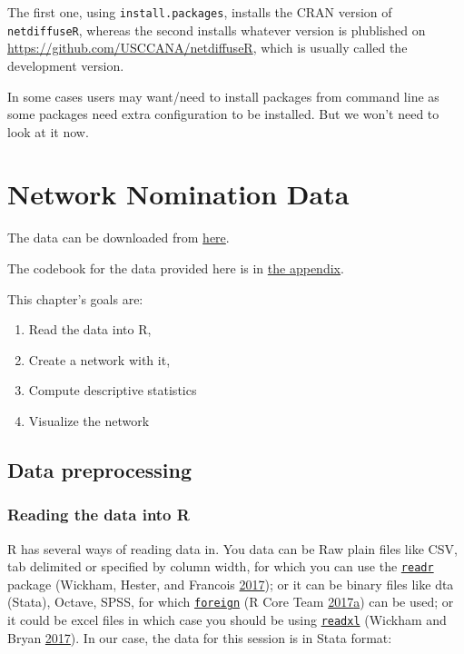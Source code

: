 \documentclass[]{book}
\theoremstyle{definition}
\theoremstyle{definition}
\theoremstyle{definition}
\theoremstyle{remark}
\begin{document}
The first one, using \texttt{install.packages}, installs the CRAN
version of \texttt{netdiffuseR}, whereas the second installs whatever
version is plublished on \url{https://github.com/USCCANA/netdiffuseR},
which is usually called the development version.

In some cases users may want/need to install packages from command line
as some packages need extra configuration to be installed. But we won't
need to look at it now.

\chapter{Network Nomination Data}\label{network-nomination-data}

The data can be downloaded from
\href{https://cdn.rawgit.com/gvegayon/appliedsnar/fdc0d26f/03-sns.dta}{here}.

The codebook for the data provided here is in
\protect\hyperlink{sns-data}{the appendix}.

This chapter's goals are:

\begin{enumerate}
\def\labelenumi{\arabic{enumi}.}
\item
  Read the data into R,
\item
  Create a network with it,
\item
  Compute descriptive statistics
\item
  Visualize the network
\end{enumerate}

\section{Data preprocessing}\label{data-preprocessing}

\subsection{Reading the data into R}\label{reading-the-data-into-r}

R has several ways of reading data in. You data can be Raw plain files
like CSV, tab delimited or specified by column width, for which you can
use the \href{https://cran.r-project.org/package=readr}{\texttt{readr}}
package (Wickham, Hester, and Francois
\protect\hyperlink{ref-R-readr}{2017}); or it can be binary files like
dta (Stata), Octave, SPSS, for which
\href{https://cran.r-project.org/package=readr}{\texttt{foreign}} (R
Core Team
\protect\hyperlink{ref-R-foreign}{2017}\protect\hyperlink{ref-R-foreign}{a})
can be used; or it could be excel files in which case you should be
using \href{https://cran.r-project.org/package=readxl}{\texttt{readxl}}
(Wickham and Bryan \protect\hyperlink{ref-R-readxl}{2017}). In our case,
the data for this session is in Stata format:
\end{document}
